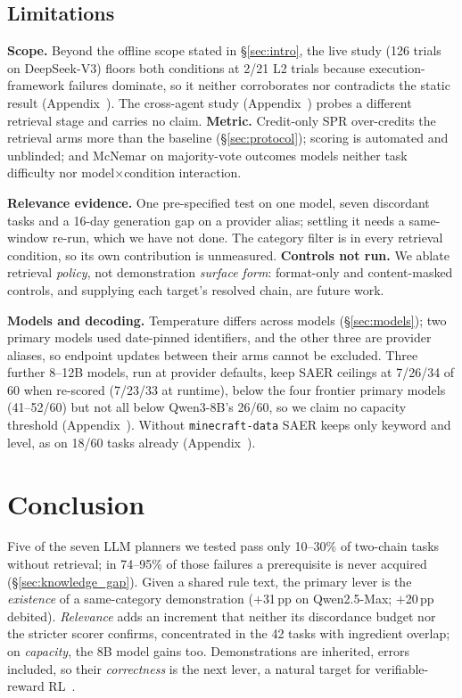\documentclass[letterpaper]{article} %
\newcommand{\secref}[1]{\S\ref{#1}}
\newcommand{\appref}[1]{Appendix~\getrefnumber{#1}}
\begin{document}
\subsection{Limitations}
\label{sec:limits}

\noindent\textbf{Scope.}  Beyond the offline scope stated in \secref{sec:intro}, the live study (126 trials on DeepSeek-V3) floors both conditions at 2/21 L2
trials because execution-framework failures dominate, so it neither
corroborates nor contradicts the static result (\appref{sec:live}).  The
cross-agent study (\appref{app:crossagent}) probes a different retrieval stage
and carries no claim.  \textbf{Metric.}  Credit-only SPR over-credits the retrieval arms more than
the baseline (\secref{sec:protocol}); scoring is automated and unblinded; and
McNemar on majority-vote outcomes models neither task difficulty nor
model$\times$condition interaction.

\noindent\textbf{Relevance evidence.}  One pre-specified test on one model, seven
discordant tasks and a 16-day generation gap on a provider alias; settling it
needs a same-window re-run, which we have not done.  The category filter is in
every retrieval condition, so its own contribution is unmeasured.  \textbf{Controls not run.}  We ablate retrieval \emph{policy}, not demonstration
\emph{surface form}: format-only and content-masked controls, and supplying each target's resolved chain, are future work.

\noindent\textbf{Models and decoding.}  Temperature differs across models
(\secref{sec:models}); two primary models used date-pinned identifiers, and the
other three are provider aliases, so endpoint updates between their arms cannot
be excluded.  Three further 8--12B models, run at provider
defaults, keep SAER ceilings at 7/26/34 of 60 when re-scored (7/23/33 at runtime), below the four frontier primary
models (41--52/60) but not all below Qwen3-8B's 26/60, so we claim no
capacity threshold (\appref{app:capacity}).  Without \texttt{minecraft-data} SAER keeps only keyword and level, as on
18/60 tasks already (\appref{app:strata}).

\section{Conclusion}
\label{sec:conclusion}

Five of the seven LLM planners we tested pass only 10--30\% of two-chain tasks
without retrieval; in 74--95\% of those failures a prerequisite is never acquired
(\secref{sec:knowledge_gap}).  Given a shared rule text, the primary lever is the \emph{existence} of a
same-category demonstration ($+$31\,pp on Qwen2.5-Max; $+$20\,pp debited).
\emph{Relevance} adds an increment that neither its discordance budget nor the
stricter scorer confirms, concentrated in the 42 tasks with ingredient overlap;
on \emph{capacity}, the 8B model gains too.  Demonstrations are inherited, errors
included, so their \emph{correctness} is the next lever, a natural target for
verifiable-reward RL~\citep{zeng2025rlve}.
\end{document}
